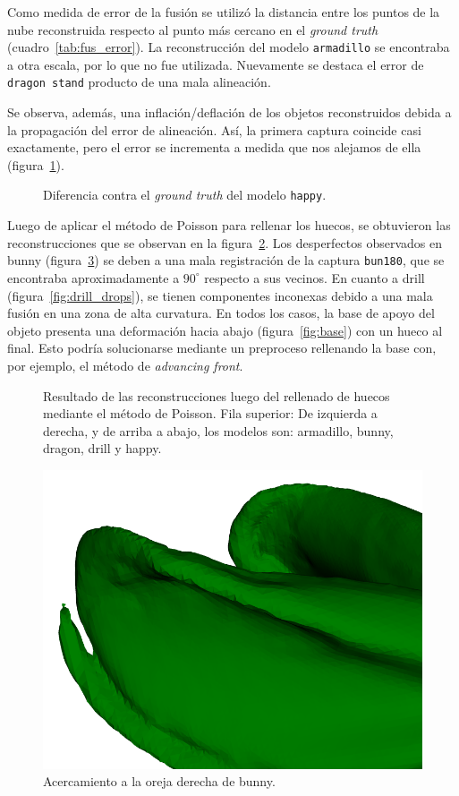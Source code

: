 		Como medida de error de la fusión se utilizó la distancia entre los puntos de la nube reconstruida
		respecto al punto más cercano en el \emph{ground truth} (cuadro~\ref{tab:fus_error}).
		La reconstrucción del modelo \texttt{armadillo} se encontraba a otra
		escala, por lo que no fue utilizada.
		Nuevamente se destaca el error de \texttt{dragon stand} producto de una mala alineación.

		


		Se observa, además, una inflación/deflación de los objetos
		reconstruidos debida a la propagación del error de alineación.  Así, la
		primera captura coincide casi exactamente, pero el error se incrementa
		a medida que nos alejamos de ella (figura~\ref{fig:fus_happy}).

		\begin{figure}
			\caption{\label{fig:fus_happy}Diferencia contra el \emph{ground truth} del modelo \texttt{happy}.}
		\end{figure}


		Luego de aplicar el método de Poisson para rellenar los huecos, se
		obtuvieron las reconstrucciones que se observan en la
		figura~\ref{fig:poiss_all}.
		Los desperfectos observados en bunny (figura~\ref{fig:bun_ear}) se deben a una mala registración
		de la captura \texttt{bun180}, que se encontraba aproximadamente a
		$90^{\circ}$ respecto a sus vecinos.
		En cuanto a drill (figura~\ref{fig:drill_drops}), se tienen componentes
		inconexas debido a una mala fusión en una zona de alta curvatura.
		En todos los casos, la base de apoyo del objeto presenta una
		deformación hacia abajo (figura~\ref{fig:base}) con un hueco al final.
		Esto podría solucionarse mediante un preproceso rellenando la base con,
		por ejemplo, el método de \emph{advancing front}.

		\begin{figure}
			\caption{\label{fig:poiss_all}Resultado de las reconstrucciones luego del rellenado de huecos mediante el método de Poisson.
			Fila superior:
			De izquierda a derecha, y de arriba a abajo, los modelos son: armadillo, bunny, dragon, drill y happy.}
		\end{figure}

		\begin{figure}
			\centering
			\includegraphics[max width=.5\linewidth, max height=.25\textheight, keepaspectratio]
				{img/bunny_ear}
			\caption{\label{fig:bun_ear}Acercamiento a la oreja derecha de bunny.}
		\end{figure}

